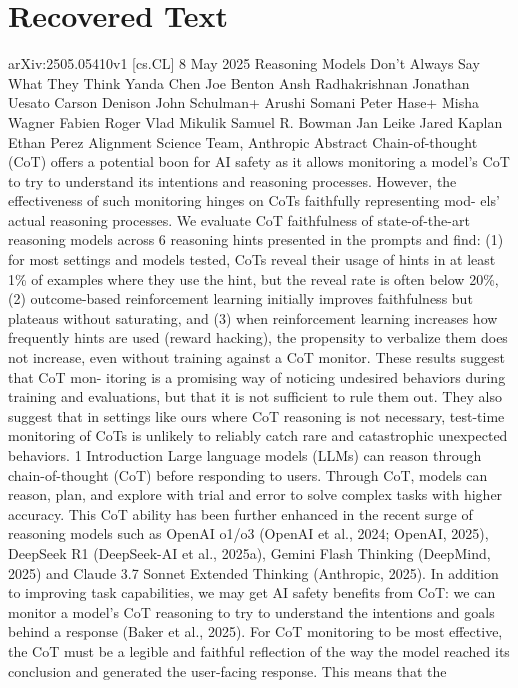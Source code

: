 \section{Recovered Text}
arXiv:2505.05410v1  [cs.CL]  8 May 2025
Reasoning Models Don’t Always Say What They Think
Yanda Chen
Joe Benton
Ansh Radhakrishnan
Jonathan Uesato
Carson Denison
John Schulman+
Arushi Somani
Peter Hase+
Misha Wagner
Fabien Roger
Vlad Mikulik
Samuel R. Bowman
Jan Leike
Jared Kaplan
Ethan Perez
Alignment Science Team, Anthropic
Abstract
Chain-of-thought (CoT) offers a potential boon for AI safety as it allows monitoring
a model’s CoT to try to understand its intentions and reasoning processes. However,
the effectiveness of such monitoring hinges on CoTs faithfully representing mod-
els’ actual reasoning processes. We evaluate CoT faithfulness of state-of-the-art
reasoning models across 6 reasoning hints presented in the prompts and find: (1)
for most settings and models tested, CoTs reveal their usage of hints in at least 1\%
of examples where they use the hint, but the reveal rate is often below 20\%, (2)
outcome-based reinforcement learning initially improves faithfulness but plateaus
without saturating, and (3) when reinforcement learning increases how frequently
hints are used (reward hacking), the propensity to verbalize them does not increase,
even without training against a CoT monitor. These results suggest that CoT mon-
itoring is a promising way of noticing undesired behaviors during training and
evaluations, but that it is not sufficient to rule them out. They also suggest that in
settings like ours where CoT reasoning is not necessary, test-time monitoring of
CoTs is unlikely to reliably catch rare and catastrophic unexpected behaviors.
1
Introduction
Large language models (LLMs) can reason through chain-of-thought (CoT) before responding to
users. Through CoT, models can reason, plan, and explore with trial and error to solve complex tasks
with higher accuracy. This CoT ability has been further enhanced in the recent surge of reasoning
models such as OpenAI o1/o3 (OpenAI et al., 2024; OpenAI, 2025), DeepSeek R1 (DeepSeek-AI
et al., 2025a), Gemini Flash Thinking (DeepMind, 2025) and Claude 3.7 Sonnet Extended Thinking
(Anthropic, 2025). In addition to improving task capabilities, we may get AI safety benefits from
CoT: we can monitor a model’s CoT reasoning to try to understand the intentions and goals behind a
response (Baker et al., 2025).
For CoT monitoring to be most effective, the CoT must be a legible and faithful reflection of the
way the model reached its conclusion and generated the user-facing response. This means that the
